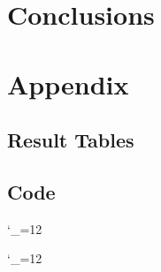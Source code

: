 \documentclass[11pt]{article}
\newcommand{\code}{\begingroup
  \catcode`_=12 \docode}
\newcommand{\docode}[2]{
	\begin{framed}
	\end{framed}\endgroup}
\begin{document}
\section{Conclusions}
\label{sec:conclusions}


\nocite{*}



\section*{Appendix}
\subsection*{Result Tables}
\subsection*{Code}
\code{../onetree.h}{C++}
\code{../onetree.cpp}{C++}


\end{document}
